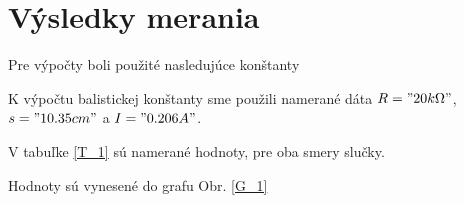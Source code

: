 \section{Výsledky merania}
Pre výpočty boli použité nasledujúce konštanty

K výpočtu balistickej konštanty sme použili namerané dáta $R="20 k\Omega"$, $s="10.35 cm"$ a $I="0.206 A"$.

V tabuľke \ref{T_1} sú namerané hodnoty, pre oba smery slučky.

Hodnoty sú vynesené do grafu Obr. \ref{G_1}

